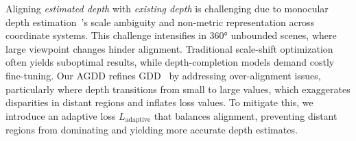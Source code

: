 \vspace{3pt}
Aligning \textit{estimated depth} with \textit{existing depth} is challenging due to monocular depth estimation~\cite{ke2023repurposing}'s scale ambiguity and non-metric representation across coordinate systems. This challenge intensifies in 360° unbounded scenes, where large viewpoint changes hinder alignment. Traditional scale-shift optimization often yields suboptimal results, while depth-completion models demand costly fine-tuning. Our AGDD refines GDD~\cite{yu2024wonderworld} by addressing over-alignment issues, particularly where depth transitions from small to large values, which exaggerates disparities in distant regions and inflates loss values. To mitigate this, we introduce an adaptive loss $L_{\text{adaptive}}$ that balances alignment, preventing distant regions from dominating and yielding more accurate depth estimates.

